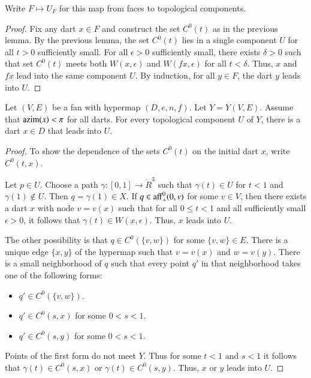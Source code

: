 Write $F\mapsto U_F$ for this map from faces to topological components.

\begin{proof}  Fix any dart $x\in F$ and construct the set $C^0(t)$ as
in the previous lemma.  By the previous lemma, the set $C^0(t)$ lies in a single
component $U$ for all $t>0$ sufficiently small.  For all $\epsilon>0$
sufficiently small, there exists $\delta>0$ such that set $C^0(t)$ meets
both $W(x,\epsilon)$ and $W(f x,\epsilon)$ for all $t<\delta$.  Thus,
$x$ and $f x$ lead into the same component $U$.  By induction, for all
$y\in F$, the dart $y$ leads into $U$.
\end{proof}

\begin{lemma}
Let $(V,E)$ be a fan with hypermap $(D,e,n,f)$. Let $Y=Y(V,E)$. Assume that ${\operatorname{azim}}(x)<\pi$ for all darts.  For every topological component $U$ of $Y$, there is a dart $x\in D$ that leads into $U$.
\end{lemma}

\begin{proof}  
To show the dependence of the sets $C^0(t)$ on the initial dart $x$, write $C^0(t,x)$.

Let $p\in U$.  Choose a path $\gamma:[0,1]\to \ring{R}^3$
such that $\gamma(t)\in U$ for $t<1$ and $\gamma(1)\not\in U$.  Then
$q=\gamma(1)\in X$.  If $q\in{\operatorname{aff}}^0_+(0,v)$ for some $v\in V$,
then there exists a dart $x$ with node $v = v(x)$ such that for 
all $0\le t < 1$ and all sufficiently
small $\epsilon>0$, it follows that $\gamma(t)\in W(x,\epsilon)$.  Thus,
$x$ leads into $U$.

The other possibility is that
$q\in C^0(\{v,w\})$ for some $\{v,w\}\in E$.  There is a unique
edge $\{x,y\}$ of the hypermap such that $v=v(x)$ and $w=v(y)$.  
There
is a small neighborhood of $q$ such that every point $q'$ in that neighborhood
takes one of the following forms:
\begin{itemize} \item $q'\in C^0(\{v,w\})$.
\item $q'\in C^0(s,x)$ for some $0<s<1$.
\item $q'\in C^0(s,y)$ for some $0<s<1$.
\end{itemize}
Points of the first form do not meet $Y$.  Thus for some $t<1$ and $s<1$
it follows that $\gamma(t)\in C^0(s,x)$ or $\gamma(t)\in C^0(s,y)$.  Thus,
$x$ or $y$ leads into $U$.
\end{proof}

